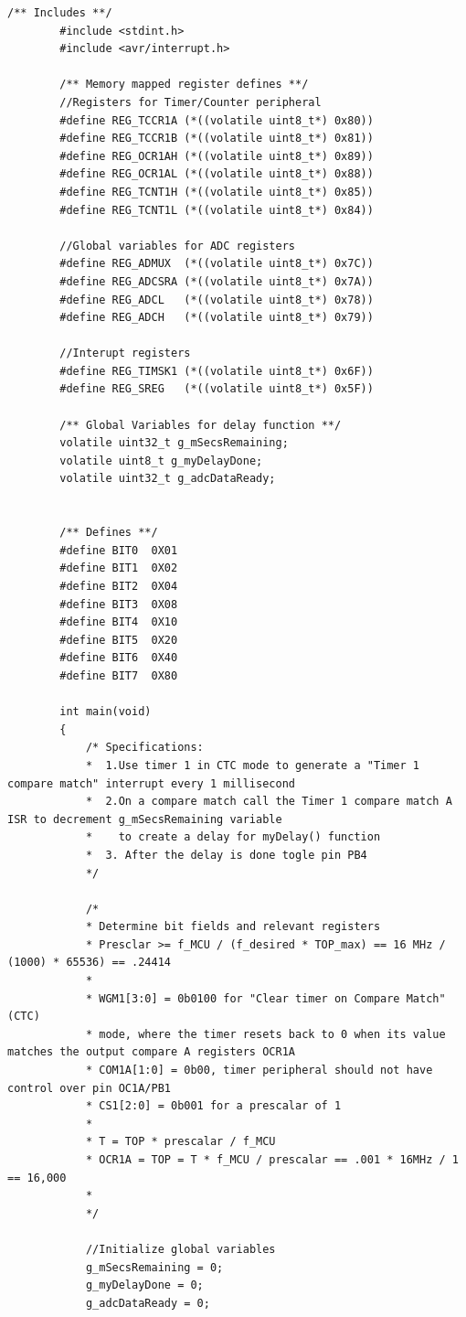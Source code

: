 \documentclass[11pt,pdftex,portrait,letterpaper]{article}
\begin{document}
	\begin{lstlisting}[caption={Program 2}, label=l:programx]
		/** Includes **/
		#include <stdint.h>
		#include <avr/interrupt.h>
		
		/** Memory mapped register defines **/
		//Registers for Timer/Counter peripheral
		#define REG_TCCR1A (*((volatile uint8_t*) 0x80))
		#define REG_TCCR1B (*((volatile uint8_t*) 0x81))
		#define REG_OCR1AH (*((volatile uint8_t*) 0x89))
		#define REG_OCR1AL (*((volatile uint8_t*) 0x88))
		#define REG_TCNT1H (*((volatile uint8_t*) 0x85))
		#define REG_TCNT1L (*((volatile uint8_t*) 0x84))
		
		//Global variables for ADC registers
		#define REG_ADMUX  (*((volatile uint8_t*) 0x7C))
		#define REG_ADCSRA (*((volatile uint8_t*) 0x7A))
		#define REG_ADCL   (*((volatile uint8_t*) 0x78))
		#define REG_ADCH   (*((volatile uint8_t*) 0x79))
		
		//Interupt registers
		#define REG_TIMSK1 (*((volatile uint8_t*) 0x6F))
		#define REG_SREG   (*((volatile uint8_t*) 0x5F))
		
		/** Global Variables for delay function **/
		volatile uint32_t g_mSecsRemaining;
		volatile uint8_t g_myDelayDone;
		volatile uint32_t g_adcDataReady;
		
		
		/** Defines **/
		#define BIT0  0X01
		#define BIT1  0X02
		#define BIT2  0X04
		#define BIT3  0X08
		#define BIT4  0X10
		#define BIT5  0X20
		#define BIT6  0X40
		#define BIT7  0X80
		
		int main(void)
		{
			/* Specifications:
			*  1.Use timer 1 in CTC mode to generate a "Timer 1 compare match" interrupt every 1 millisecond
			*  2.On a compare match call the Timer 1 compare match A ISR to decrement g_mSecsRemaining variable
			*    to create a delay for myDelay() function
			*  3. After the delay is done togle pin PB4
			*/
			
			/*
			* Determine bit fields and relevant registers
			* Presclar >= f_MCU / (f_desired * TOP_max) == 16 MHz / (1000) * 65536) == .24414
			* 
			* WGM1[3:0] = 0b0100 for "Clear timer on Compare Match" (CTC)
			* mode, where the timer resets back to 0 when its value matches the output compare A registers OCR1A
			* COM1A[1:0] = 0b00, timer peripheral should not have control over pin OC1A/PB1
			* CS1[2:0] = 0b001 for a prescalar of 1
			* 
			* T = TOP * prescalar / f_MCU
			* OCR1A = TOP = T * f_MCU / prescalar == .001 * 16MHz / 1 == 16,000
			* 
			*/
			
			//Initialize global variables
			g_mSecsRemaining = 0;
			g_myDelayDone = 0;
			g_adcDataReady = 0;
			

\end{lstlisting}
\end{document}
